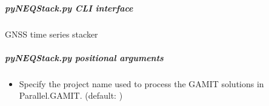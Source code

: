 \documentclass[letterpaper,10pt,english]{sphinxmanual}
\begin{document}
\begin{fulllineitems}
\label{\detokenize{pgamit.classes:pgamit.classes.pyNEQStack.sql_select}}
\pysigstartsignatures
\pysiglinewithargsret
{}
{\sphinxparamcomma {}\sphinxparamcomma {}}
{}
\pysigstopsignatures
\end{fulllineitems}


\begin{fulllineitems}
\label{\detokenize{pgamit.classes:pgamit.classes.pyNEQStack.sql_select_union}}
\pysigstartsignatures
\pysiglinewithargsret
{}
{\sphinxparamcomma {}\sphinxparamcomma {}\sphinxparamcomma {}\sphinxparamcomma {}}
{}
\pysigstopsignatures
\end{fulllineitems}



\subparagraph{pyNEQStack.py \sphinxhyphen{} CLI interface}
\label{\detokenize{pgamit.classes:pyNEQStack.py---CLI-interface}}
\sphinxAtStartPar
GNSS time series stacker

\begin{sphinxVerbatim}[commandchars=\\\{\}]
 \PYG{p}{[}\PYG{p}{]} \PYG{p}{[}  \PYG{p}{[} \PYG{p}{]}\PYG{p}{]}  
\end{sphinxVerbatim}


\subparagraph{pyNEQStack.py positional arguments}
\label{\detokenize{pgamit.classes:pyNEQStack.py-positional-arguments}}\begin{itemize}
\item {} 
\sphinxAtStartPar
{\hyperref[\detokenize{pgamit.classes:pyNEQStack.py-_project-name_}]{}} \sphinxhyphen{} Specify the project name used to process the GAMIT solutions in Parallel.GAMIT. (default: )

\end{itemize}
\end{document}
